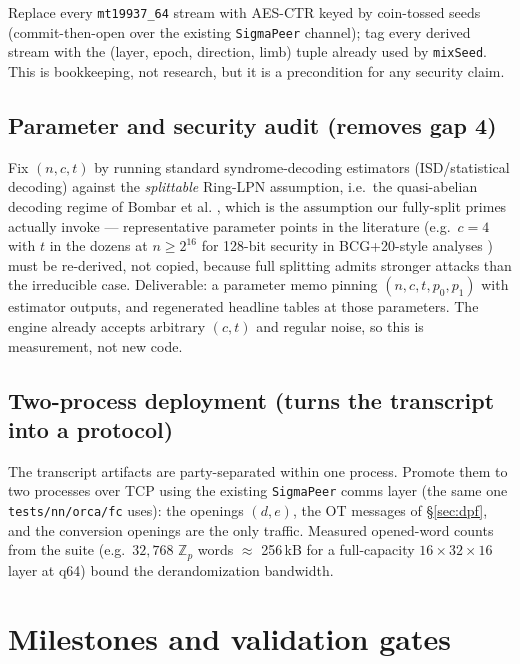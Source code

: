 \documentclass[11pt]{article}
\newcommand{\Z}{\mathbb{Z}}
\begin{document}
Replace every \texttt{mt19937\_64} stream with AES-CTR keyed by
coin-tossed seeds (commit-then-open over the existing \texttt{SigmaPeer}
channel); tag every derived stream with the (layer, epoch, direction, limb)
tuple already used by \texttt{mixSeed}. This is bookkeeping, not research,
but it is a precondition for any security claim.

\subsection{Parameter and security audit (removes gap 4)}
\label{sec:params}

Fix $(n, c, t)$ by running standard syndrome-decoding estimators
(ISD/statistical decoding) against the \emph{splittable} Ring-LPN assumption,
i.e.\ the quasi-abelian decoding regime of Bombar et al.
\cite{bombar2023quasiabelian}, which is the assumption our fully-split primes
actually invoke --- representative parameter points in the literature (e.g.\
$c{=}4$ with $t$ in the dozens at $n \ge 2^{16}$ for 128-bit security in
BCG+20-style analyses \cite{boyle2020ringlpn}) must be re-derived, not
copied, because full splitting admits stronger attacks than the irreducible
case. Deliverable: a parameter memo pinning $(n, c, t, p_0, p_1)$ with
estimator outputs, and regenerated headline tables at those parameters.
The engine already accepts arbitrary $(c, t)$ and regular noise, so this is
measurement, not new code.

\subsection{Two-process deployment (turns the transcript into a protocol)}
\label{sec:deploy}

The transcript artifacts are party-separated within one process. Promote them
to two processes over TCP using the existing \texttt{SigmaPeer} comms layer
(the same one \texttt{tests/nn/orca/fc} uses): the openings $(d, e)$, the OT
messages of \S\ref{sec:dpf}, and the conversion openings are the only
traffic. Measured opened-word counts from the suite
(e.g.\ $32{,}768$ $\Z_p$ words $\approx$ 256\,kB for a full-capacity
$16{\times}32{\times}16$ layer at q64) bound the derandomization bandwidth.

\section{Milestones and validation gates}
\label{sec:milestones}
\end{document}
